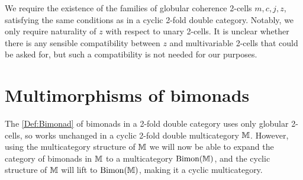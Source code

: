 We require the existence of the families of globular coherence 2-cells $m,c,j,z$, satisfying the same conditions as in a cyclic 2-fold double category. Notably, we only require naturality of $z$ with respect to unary 2-cells. It is unclear whether there is any sensible compatibility between $z$ and multivariable 2-cells that could be asked for, but such a compatibility is not needed for our purposes.

\section{Multimorphisms of bimonads}

The \cref{Def:Bimonad} of bimonads in a 2-fold double category uses only globular 2-cells, so works unchanged in a cyclic 2-fold double multicategory $\mathbb{M}$. However, using the multicategory structure of $\mathbb{M}$ we will now be able to expand the category of bimonads in $\mathbb{M}$ to a multicategory $\mathrm{Bimon}(\mathbb{M})$, and the cyclic structure of $\mathbb{M}$ will lift to $\mathrm{Bimon}(\mathbb{M})$, making it a cyclic multicategory.

